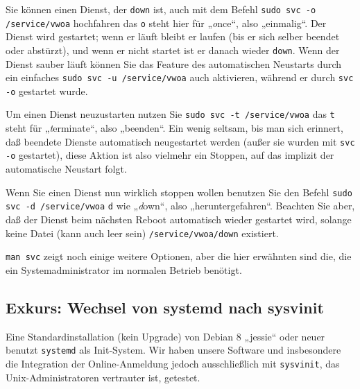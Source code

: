 \documentclass{tarentanleitung}
\begin{document}
Sie können einen Dienst, der \texttt{down} ist, auch mit dem Befehl
\texttt{sudo svc -o /service/vwoa} hochfahren \dash das \texttt{o} steht
hier für „\emph{o}nce“, also „einmalig“. Der Dienst wird gestartet; wenn
er läuft bleibt er laufen (bis er sich selber beendet oder abstürzt), und
wenn er nicht startet ist er danach wieder \texttt{down}. Wenn der Dienst
sauber läuft können Sie das Feature des automatischen Neustarts durch ein
einfaches \texttt{sudo svc -u /service/vwoa} auch aktivieren, während er
durch \texttt{svc -o} gestartet wurde.

Um einen Dienst neuzustarten nutzen Sie \texttt{sudo svc -t /service/vwoa}
\dash das \texttt{t} steht für „\emph{t}erminate“, also „beenden“. Ein wenig
seltsam, bis man sich erinnert, daß beendete Dienste automatisch neugestartet
werden (außer sie wurden mit \texttt{svc -o} gestartet), diese Aktion ist
also vielmehr ein Stoppen, auf das implizit der automatische Neustart folgt.

Wenn Sie einen Dienst nun wirklich stoppen wollen benutzen Sie den Befehl
\texttt{sudo svc -d /service/vwoa} \dash \texttt{d} wie „\emph{d}own“, also
„heruntergefahren“. Beachten Sie aber, daß der Dienst beim nächsten Reboot
automatisch wieder gestartet wird, solange keine Datei (kann auch leer sein)
\texttt{/service/vwoa/down} existiert.

\texttt{man svc} zeigt noch einige weitere Optionen, aber die hier erwähnten
sind die, die ein Systemadministrator im normalen Betrieb benötigt.

\subsection{Exkurs: Wechsel von systemd nach sysvinit}\label{subsec:intro-sysvinit}

Eine Standardinstallation (kein Upgrade) von Debian 8 „jessie“ oder neuer
benutzt \texttt{systemd} als Init-System. Wir haben unsere Software und
insbesondere die Integration der Online-Anmeldung jedoch ausschließlich
mit \texttt{sysvinit}, das Unix-Administratoren vertrauter ist, getestet.
\end{document}
